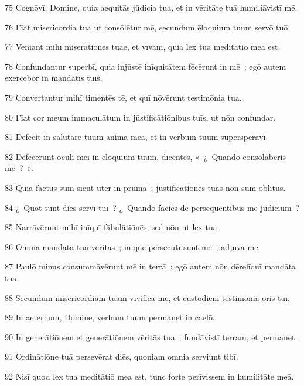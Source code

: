 \psalmVerse
  {\phantom{0}75}
  {Cognōvī, Domine, quia aequitās jūdicia tua, et in vēritāte tuā humiliāvistī mē.}


\psalmVerse
  {\phantom{0}76}
  {Fīat misericordia tua ut consōlētur mē, secundum ēloquium tuum servō tuō.}


\psalmVerse
  {\phantom{0}77}
  {Veniant mihī miserātiōnēs tuae, et vīvam, quia lex tua meditātiō mea est.}


\psalmVerse
  {\phantom{0}78}
  {Confundantur superbī, quia injūstē inīquitātem fēcērunt in mē~; egō autem exercēbor in mandātīs tuīs.}


\psalmVerse
  {\phantom{0}79}
  {Convertantur mihī timentēs tē, et quī nōvērunt testimōnia tua.}


\psalmVerse
  {\phantom{0}80}
  {Fīat cor meum immaculātum in jūstificātiōnibus tuīs, ut nōn confundar.}


\psalmVerse
  {\phantom{0}81}
  {Dēfēcit in salūtāre tuum anima mea, et in verbum tuum superspērāvī.}


\psalmVerse
  {\phantom{0}82}
  {Dēfēcērunt oculī meī in ēloquium tuum, dīcentēs, «~¿~Quandō consōlāberis mē~?~».}


\psalmVerse
  {\phantom{0}83}
  {Quia factus sum sīcut uter in pruīnā~; jūstificātiōnēs tuās nōn sum oblītus.}


\psalmVerse
  {\phantom{0}84}
  {¿~Quot sunt diēs servī tuī~? ¿~Quandō faciēs dē persequentibus mē jūdicium~?}


\psalmVerse
  {\phantom{0}85}
  {Narrāvērunt mihī inīquī fābulātiōnēs, sed nōn ut lex tua.}


\psalmVerse
  {\phantom{0}86}
  {Omnia mandāta tua vēritās~; inīquē persecūtī sunt mē~; adjuvā mē.}


\psalmVerse
  {\phantom{0}87}
  {Paulō minus consummāvērunt mē in terrā~; egō autem nōn dērelīquī mandāta tua.}


\psalmVerse
  {\phantom{0}88}
  {Secundum misericordiam tuam vīvificā mē, et custōdiem testimōnia ōris tuī.}


\psalmVerse
  {\phantom{0}89}
  {In aeternum, Domine, verbum tuum permanet in caelō.}


\psalmVerse
  {\phantom{0}90}
  {In generātiōnem et generātiōnem vēritās tua~; fundāvistī terram, et permanet.}


\psalmVerse
  {\phantom{0}91}
  {Ordinātiōne tuā persevērat diēs, quoniam omnia serviunt tibī.}


\psalmVerse
  {\phantom{0}92}
  {Nisī quod lex tua meditātiō mea est, tunc forte perīvissem in humilitāte meā.}


